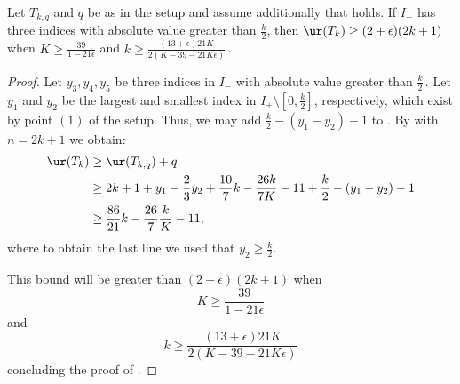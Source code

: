 \documentclass{toc}
\begin{document}
\begin{lemma} \label{lem:far}  Let $T_{k,q}$ and $q$ be as in the setup and assume
additionally that  holds.
If  $I_{-}$ has three indices with absolute value greater than $\frac{k}{2}$,
then
$\ur(T_k)\geq (2+\epsilon)(2k+1)$ when
$ K\geq \frac{39}{1-21\epsilon}$ 
and
$ 
k\geq \frac{(13+\epsilon)21K}{2(K-39-21K\epsilon)}
$\,.
\end{lemma}
\begin{proof}
Let $y_3,y_4,y_5$ be   three indices in $I_{-}$ with absolute value greater
than $\frac{k}{2}$\,. Let 
$y_1$ and $y_2$ be %
the largest and smallest index in $I_{+}\setminus [0, \frac{k}{2} ]$,
respectively,  %
which exist by point $(1)$ of the %
setup.  %
Thus, we may add
$\frac k2-(y_1-y_2)-1$ to . 
By  with $n=2k+1$ we obtain:
\begin{align*}\ur(T_k)&\geq \ur(T_{k,q})+q\\
&\geq 
2k+1+y_1-\frac{2}{3}y_2+\frac{10}{7}k-\frac{26k}{7K}-11+\frac{k}{2}-(y_1-y_2)-1\\
&\geq \frac{86}{21}k-\frac{26}{7}\frac kK-11,
\end{align*}
where to obtain the last  line we used that $y_2\geq \frac{k}{2}$.

This bound will be greater than $(2+\epsilon)(2k+1)$ when
$$
K\geq 
\frac{39}{1-21\epsilon}
$$
and
$$
k\geq\frac{(13+\epsilon)21K}{2(K-39-21K\epsilon)}
$$
%
%
concluding the proof of 
. %
\end{proof}
\end{document}
